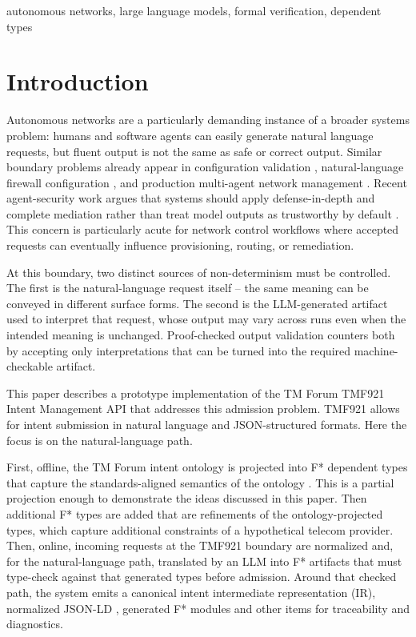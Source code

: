 \documentclass[conference]{IEEEtran}
\begin{document}
\begin{IEEEkeywords}
autonomous networks, large language models, formal verification, dependent types
\end{IEEEkeywords}

\section{Introduction}

Autonomous networks are a particularly demanding instance of a broader systems problem: humans and software agents can easily generate natural language requests, but fluent output is not the same as safe or correct output. Similar boundary problems already appear in configuration validation \cite{ciri}, natural-language firewall configuration \cite{firewall_nl}, and production multi-agent network management \cite{confucius}. Recent agent-security work argues that systems should apply defense-in-depth and complete mediation rather than treat model outputs as trustworthy by default \cite{security_principles}. This concern is particularly acute for network control workflows where accepted requests can eventually influence provisioning, routing, or remediation.

At this boundary, two distinct sources of non-determinism must be controlled. The first is the natural-language request itself -- the same meaning can be conveyed in different surface forms. The second is the LLM-generated artifact used to interpret that request, whose output may vary across runs even when the intended meaning is unchanged. Proof-checked output validation counters both by accepting only interpretations that can be turned into the required machine-checkable artifact.

This paper describes a prototype implementation of the TM Forum \cite{tmforum_site} TMF921 Intent Management API \cite{tmf921_api_page} that addresses this admission problem. TMF921 allows for intent submission in natural language and JSON-structured formats. Here the focus is on the natural-language path.

First, offline, the TM Forum intent ontology is projected into F* \cite{fstar_site,fstar_popl} dependent types that capture the standards-aligned semantics of the ontology \cite{tr290a,tr292d}. This is a partial projection enough to demonstrate the ideas discussed in this paper. Then additional F* types are added that are refinements of the ontology-projected types, which capture additional constraints of a hypothetical telecom provider. Then, online, incoming requests at the TMF921 boundary are normalized and, for the natural-language path, translated by an LLM into F* artifacts that must type-check against that generated types before admission. Around that checked path, the system emits a canonical intent intermediate representation (IR), normalized JSON-LD \cite{jsonld11}, generated F* modules and other items for traceability and diagnostics.
\end{document}
